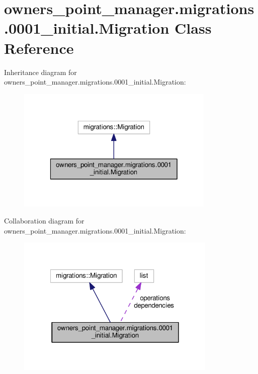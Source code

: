 \hypertarget{classowners__point__manager_1_1migrations_1_10001__initial_1_1Migration}{\section{owners\-\_\-point\-\_\-manager.\-migrations.0001\-\_\-initial.Migration Class Reference}
\label{classowners__point__manager_1_1migrations_1_10001__initial_1_1Migration}
}


Inheritance diagram for owners\-\_\-point\-\_\-manager.\-migrations.0001\-\_\-initial.Migration\-:
\nopagebreak
\begin{figure}[H]
\begin{center}
\leavevmode
\includegraphics[width=268pt]{classowners__point__manager_1_1migrations_1_10001__initial_1_1Migration__inherit__graph}
\end{center}
\end{figure}


Collaboration diagram for owners\-\_\-point\-\_\-manager.\-migrations.0001\-\_\-initial.Migration\-:
\nopagebreak
\begin{figure}[H]
\begin{center}
\leavevmode
\includegraphics[width=270pt]{classowners__point__manager_1_1migrations_1_10001__initial_1_1Migration__coll__graph}
\end{center}
\end{figure}
